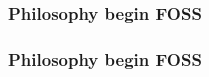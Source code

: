 \documentclass{beamer}
\begin{document}

\begin{frame}
\frametitle{Philosophy begin FOSS}



\end{frame}

\begin{frame}
\frametitle{Philosophy begin FOSS}



\end{frame}

\end{document}
